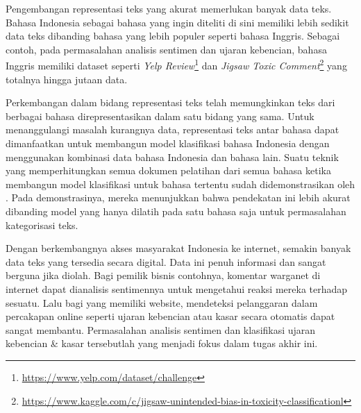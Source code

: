 Pengembangan representasi teks yang akurat memerlukan banyak data teks. Bahasa Indonesia sebagai bahasa yang ingin diteliti di sini memiliki lebih sedikit data teks dibanding bahasa yang lebih populer seperti bahasa Inggris. Sebagai contoh, pada permasalahan analisis sentimen dan ujaran kebencian, bahasa Inggris memiliki dataset seperti \textit{Yelp Review}\footnote{\url{https://www.yelp.com/dataset/challenge}} dan \textit{Jigsaw Toxic Comment}\footnote{\url{https://www.kaggle.com/c/jigsaw-unintended-bias-in-toxicity-classificationl}} yang totalnya hingga jutaan data. 

Perkembangan dalam bidang representasi teks telah memungkinkan teks dari berbagai bahasa direpresentasikan dalam satu bidang yang sama. Untuk menanggulangi masalah kurangnya data, representasi teks antar bahasa dapat dimanfaatkan untuk membangun model klasifikasi bahasa Indonesia dengan menggunakan kombinasi data bahasa Indonesia dan bahasa lain. Suatu teknik yang memperhitungkan semua dokumen pelatihan dari semua bahasa ketika membangun model klasifikasi untuk bahasa tertentu sudah didemonstrasikan oleh \parencite{Wei_Shi_Yang_2007}. Pada demonstrasinya, mereka menunjukkan bahwa pendekatan ini lebih akurat dibanding model yang hanya dilatih pada satu bahasa saja untuk permasalahan kategorisasi teks. 


Dengan berkembangnya akses masyarakat Indonesia ke internet, semakin banyak data teks yang tersedia secara digital. Data ini penuh informasi dan sangat berguna jika diolah. Bagi pemilik bisnis contohnya, komentar warganet di internet dapat dianalisis sentimennya untuk mengetahui reaksi mereka terhadap sesuatu. Lalu bagi yang memiliki website, mendeteksi pelanggaran dalam percakapan online seperti ujaran kebencian atau kasar secara otomatis dapat sangat membantu. Permasalahan analisis sentimen dan klasifikasi ujaran kebencian \& kasar tersebutlah yang menjadi fokus dalam tugas akhir ini.

